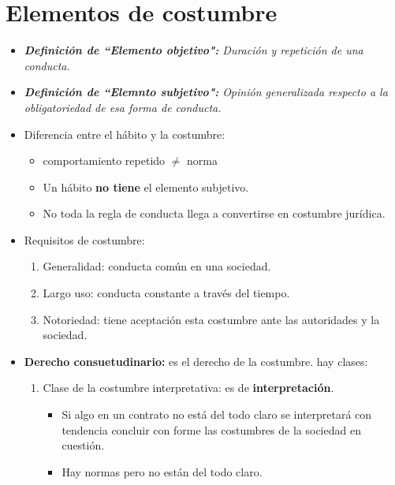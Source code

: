 \section{Elementos de costumbre}
\begin{itemize}
    \item \emph{\textbf{Definición de ``Elemento objetivo":} Duración y repetición de una conducta.}
    \item \emph{\textbf{Definición de ``Elemnto subjetivo":} Opinión generalizada respecto a la obligatoriedad de esa forma de conducta.}
    \item Diferencia entre el hábito y la costumbre:
        \begin{itemize}
            \item comportamiento repetido $\neq$ norma
            \item Un hábito \textbf{no tiene }el elemento subjetivo.
            \item No toda la regla de conducta llega a convertirse en costumbre jurídica.
        \end{itemize}
    
    \item Requisitos de costumbre:
        \begin{enumerate}
            \item Generalidad: conducta común en una sociedad.
            \item Largo uso: conducta constante a través del tiempo.
            \item Notoriedad: tiene aceptación esta costumbre ante las autoridades y la sociedad.
        \end{enumerate}
    
    \item \textbf{Derecho consuetudinario:} es el derecho de la costumbre. hay clases:
        \begin{enumerate}
            \item Clase de la costumbre interpretativa: es de \textbf{interpretación}.
                \begin{itemize}
                    \item Si algo en un contrato no está del todo claro se interpretará con tendencia concluir con forme las costumbres de la sociedad en cuestión.
                    \item Hay normas pero no están del todo claro.
                \end{itemize}
            

\end{enumerate}
\end{itemize}

